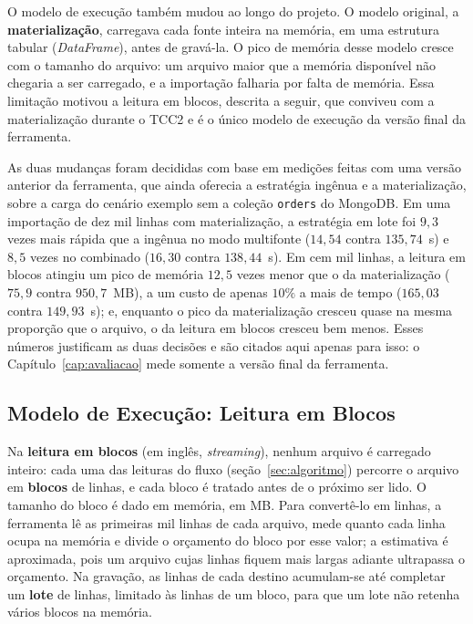 O modelo de execução também mudou ao longo do projeto. O modelo original, a
\textbf{materialização}, carregava cada fonte inteira na memória, em uma estrutura tabular
(\textit{DataFrame}), antes de gravá-la. O pico de memória desse modelo cresce com o
tamanho do arquivo: um arquivo maior que a memória disponível não chegaria a ser
carregado, e a importação falharia por falta de memória. Essa limitação motivou a leitura
em blocos, descrita a seguir, que conviveu com a materialização durante o TCC2 e é o único
modelo de execução da versão final da ferramenta.

As duas mudanças foram decididas com base em medições feitas com uma versão anterior da
ferramenta, que ainda oferecia a estratégia ingênua e a materialização, sobre a carga do
cenário exemplo sem a coleção \texttt{orders} do MongoDB. Em uma importação de dez mil
linhas com materialização, a estratégia em lote foi $9{,}3$ vezes mais rápida que a ingênua
no modo multifonte ($14{,}54$ contra $135{,}74$~s) e $8{,}5$ vezes no combinado ($16{,}30$
contra $138{,}44$~s). Em cem mil linhas, a leitura em blocos atingiu um pico de memória
$12{,}5$ vezes menor que o da materialização ($75{,}9$ contra $950{,}7$~MB), a um custo de
apenas $10\%$ a mais de tempo ($165{,}03$ contra $149{,}93$~s); e, enquanto o pico da
materialização cresceu quase na mesma proporção que o arquivo, o da leitura em blocos
cresceu bem menos. Esses números justificam as duas decisões e são citados aqui apenas para
isso: o Capítulo~\ref{cap:avaliacao} mede somente a versão final da ferramenta.

\subsection{Modelo de Execução: Leitura em Blocos}
\label{sec:modelos-execucao}

Na \textbf{leitura em blocos} (em inglês, \textit{streaming}), nenhum arquivo é carregado
inteiro: cada uma das leituras do fluxo (seção~\ref{sec:algoritmo}) percorre o arquivo em
\textbf{blocos} de linhas, e cada bloco é tratado antes de o próximo ser lido. O tamanho do
bloco é dado em memória, em MB. Para convertê-lo em linhas, a ferramenta lê as primeiras mil linhas de cada
arquivo, mede quanto cada linha ocupa na memória e divide o orçamento do bloco por esse
valor; a estimativa é aproximada, pois um arquivo cujas linhas fiquem mais largas adiante
ultrapassa o orçamento. Na gravação, as linhas de cada destino acumulam-se até completar um
\textbf{lote} de linhas, limitado às linhas de um bloco, para que um lote não retenha
vários blocos na memória.

